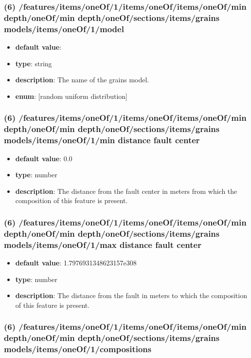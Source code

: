 \subsubsection{(6) /features/items/oneOf/1/items/oneOf/items/oneOf/min depth/oneOf/min depth/oneOf/sections/items/grains models/items/oneOf/1/model}
\begin{itemize}[leftmargin=6em]\item {\bf default value}: 
\item {\bf type}: string
\item {\bf description}: The name of the grains model.
\item {\bf enum}: [random uniform distribution]\end{itemize}\subsubsection{(6) /features/items/oneOf/1/items/oneOf/items/oneOf/min depth/oneOf/min depth/oneOf/sections/items/grains models/items/oneOf/1/min distance fault center}
\begin{itemize}[leftmargin=6em]\item {\bf default value}: 0.0
\item {\bf type}: number
\item {\bf description}: The distance from the fault center in meters from which the composition of this feature is present.
\end{itemize}\subsubsection{(6) /features/items/oneOf/1/items/oneOf/items/oneOf/min depth/oneOf/min depth/oneOf/sections/items/grains models/items/oneOf/1/max distance fault center}
\begin{itemize}[leftmargin=6em]\item {\bf default value}: 1.7976931348623157e308
\item {\bf type}: number
\item {\bf description}: The distance from the fault in meters to which the composition of this feature is present.
\end{itemize}\subsubsection{(6) /features/items/oneOf/1/items/oneOf/items/oneOf/min depth/oneOf/min depth/oneOf/sections/items/grains models/items/oneOf/1/compositions}

